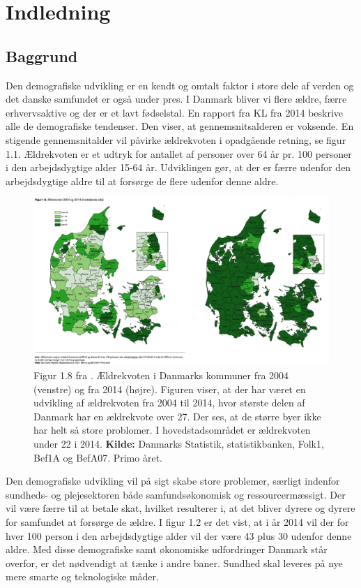 \chapter{Indledning}

\section{Baggrund}
Den demografiske udvikling er en kendt og omtalt faktor i store dele af verden og  det danske samfundet er også under pres. I Danmark bliver vi flere ældre, færre erhvervsaktive og der er et lavt fødselstal. En rapport fra KL fra 2014 beskrive alle de demografiske tendenser. Den viser, at gennemsnitsalderen er voksende. En stigende gennemsnitalder vil påvirke ældrekvoten i opadgående retning, se figur 1.1. Ældrekvoten er et udtryk for antallet af personer over 64 år pr. 100 personer i den arbejdsdygtige alder 15-64 år. \cite{KL} Udviklingen gør, at der er færre udenfor den arbejdsdygtige aldre til at forsørge de flere udenfor denne aldre. 

\begin{figure}[H]
\centering
\caption{Figur 1.8 fra \cite{KL}. Ældrekvoten i Danmarks kommuner fra 2004 (venstre) og fra 2014 (højre). Figuren viser, at der har været en udvikling af ældrekvoten fra 2004 til 2014, hvor største delen af Danmark har en ældrekvote over 27. Der ses, at de større byer ikke har helt så store problomer. I hovedstadsområdet er ældrekvoten under 22 i 2014. \textbf{Kilde:} Danmarks Statistik, statistikbanken, Folk1, Bef1A og BefA07. Primo året.}
\includegraphics[width=1\textwidth]{Figurer/Snip20160428_14}
\end{figure}

Den demografiske udvikling vil på sigt skabe store problemer, særligt indenfor sundheds- og plejesektoren både samfundsøkonomisk og ressourcermæssigt. Der vil være færre til at betale skat, hvilket resulterer i, at det bliver dyrere og dyrere for samfundet at forsørge de ældre. I figur 1.2 er det vist, at i år 2014 vil der for hver 100 person i den arbejdsdygtige alder vil der være 43 plus 30 udenfor denne aldre. Med disse demografiske samt økonomiske udfordringer Danmark står overfor, er det nødvendigt at tænke i andre baner. Sundhed skal leveres på nye mere smarte og teknologiske måder.

